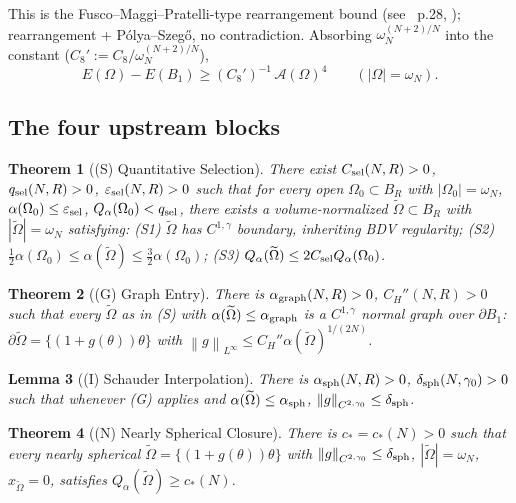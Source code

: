 \documentclass[11pt]{article}
\newtheorem{theorem}{Theorem}[section]
\newtheorem{lemma}[theorem]{Lemma}
\theoremstyle{definition}
\newcommand{\norm}[1]{\left\|#1\right\|}
\newcommand{\Fr}{\mathcal{A}}
\newcommand{\eps}{\varepsilon}
\begin{document}
This is the Fusco--Maggi--Pratelli-type rearrangement bound (see
\cite{BDV}~p.28, \cite{FMP}); rearrangement + P\'olya--Szeg\H{o}, no
contradiction. Absorbing $\omega_{N}^{(N+2)/N}$ into the constant
($C_{8}':=C_{8}/\omega_{N}^{(N+2)/N}$),
\begin{equation}\label{eq:52-clean}
   E(\Omega)-E(B_{1})\ge(C_{8}')^{-1}\,\Fr(\Omega)^{4}
   \qquad(|\Omega|=\omega_{N}).
\end{equation}

\subsection{The four upstream blocks}

\begin{theorem}[(S) Quantitative Selection]\label{thm:SEL}
There exist $C_{\rm sel}(N,R)>0$, $q_{\rm sel}(N,R)>0$,
$\eps_{\rm sel}(N,R)>0$ such that for every open
$\Omega_{0}\subset B_{R}$ with $|\Omega_{0}|=\omega_{N}$,
$\alpha(\Omega_{0})\le\eps_{\rm sel}$, $Q_{\alpha}(\Omega_{0})<q_{\rm sel}$,
there exists a volume-normalized $\widetilde\Omega\subset B_{R}$ with
$|\widetilde\Omega|=\omega_{N}$ satisfying:
(S1) $\widetilde\Omega$ has $C^{1,\gamma}$ boundary, inheriting BDV
regularity;
(S2) $\tfrac12\alpha(\Omega_{0})\le\alpha(\widetilde\Omega)\le\tfrac32\alpha(\Omega_{0})$;
(S3) $Q_{\alpha}(\widetilde\Omega)\le 2C_{\rm sel}Q_{\alpha}(\Omega_{0})$.
\end{theorem}

\begin{theorem}[(G) Graph Entry]\label{thm:GE}
There is $\alpha_{\rm graph}(N,R)>0$, $C_{H}''(N,R)>0$ such that every
$\widetilde\Omega$ as in (S) with
$\alpha(\widetilde\Omega)\le\alpha_{\rm graph}$ is a $C^{1,\gamma}$ normal
graph over $\partial B_{1}$:
$\partial\widetilde\Omega=\{(1+g(\theta))\theta\}$ with
$\norm{g}_{L^{\infty}}\le C_{H}''\alpha(\widetilde\Omega)^{1/(2N)}$.
\end{theorem}

\begin{lemma}[(I) Schauder Interpolation]\label{lem:SI}
There is $\alpha_{\rm sph}(N,R)>0$, $\delta_{\rm sph}(N,\gamma_{0})>0$
such that whenever (G) applies and $\alpha(\widetilde\Omega)\le\alpha_{\rm sph}$,
$\norm{g}_{C^{2,\gamma_{0}}}\le\delta_{\rm sph}$.
\end{lemma}

\begin{theorem}[(N) Nearly Spherical Closure]\label{thm:NS}
There is $c_{*}=c_{*}(N)>0$ such that every nearly spherical
$\widetilde\Omega=\{(1+g(\theta))\theta\}$ with
$\norm{g}_{C^{2,\gamma_{0}}}\le\delta_{\rm sph}$,
$|\widetilde\Omega|=\omega_{N}$, $x_{\widetilde\Omega}=0$, satisfies
$Q_{\alpha}(\widetilde\Omega)\ge c_{*}(N)$.
\end{theorem}
\end{document}
